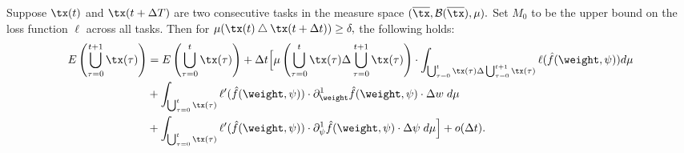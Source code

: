 \begin{lemma}\label{lem:taylor}
    Suppose $\tx(t)$ and $\tx(t+\Delta T)$ are two consecutive tasks in the measure space $(\overline{\tx}, \mathcal{B}(\overline{\tx}),\mu).$  Set $M_0$ to be the upper bound on the loss function $\ell$ across all tasks. Then for $\mu(\tx(t)\bigtriangleup \tx(t+\Delta t))\geq \delta,$ the following holds:
    \begin{align}
        E\left(\bigcup_{\tau = 0}^{t+1}\tx(\tau)\right) & = E\left(\bigcup_{\tau = 0}^{t}\tx(\tau)\right) + \Delta t\Big[\mu\left( \bigcup_{\tau = 0}^{t}\tx(\tau)\Delta \bigcup_{\tau = 0}^{t+1}\tx(\tau)\right)\cdot \displaystyle\int_{\bigcup_{\tau = 0}^{t}\tx(\tau)\Delta \bigcup_{\tau = 0}^{t+1}\tx(\tau)} \ell(\hat{f}(\weight,\psi))d\mu \nonumber \\
        & + \displaystyle\int_{\bigcup_{\tau = 0}^{t}\tx(\tau)} \ell'(\hat{f}(\weight,\psi))\cdot \partial_{\weight}^1 \hat{f}(\weight,\psi)\cdot \Delta w \hspace{1mm} d\mu \nonumber \\
        & +\displaystyle\int_{\bigcup_{\tau = 0}^{t}\tx(\tau)} \ell'(\hat{f}(\weight,\psi))\cdot \partial_\psi^1 \hat{f}(\weight,\psi)\cdot \Delta \psi \hspace{1mm}  d\mu\Big]+ o(\Delta t).\label{archfinaltaylor}
    \end{align}
\end{lemma}

